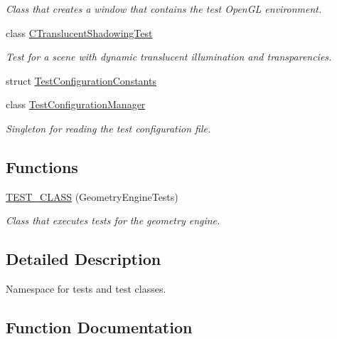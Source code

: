 \begin{DoxyCompactItemize}
\begin{DoxyCompactList}\small\item\em Class that creates a window that contains the test Open\+GL environment. \end{DoxyCompactList}\item 
class \mbox{\hyperlink{class_unit_test_1_1_c_translucent_shadowing_test}{C\+Translucent\+Shadowing\+Test}}
\begin{DoxyCompactList}\small\item\em Test for a scene with dynamic translucent illumination and transparencies. \end{DoxyCompactList}\item 
struct \mbox{\hyperlink{struct_unit_test_1_1_test_configuration_constants}{Test\+Configuration\+Constants}}
\item 
class \mbox{\hyperlink{class_unit_test_1_1_test_configuration_manager}{Test\+Configuration\+Manager}}
\begin{DoxyCompactList}\small\item\em Singleton for reading the test configuration file. \end{DoxyCompactList}\end{DoxyCompactItemize}
\subsection*{Functions}
\begin{DoxyCompactItemize}
\item 
\mbox{\hyperlink{namespace_unit_test_aa27c1a34f019a757474599d420492bf6}{T\+E\+S\+T\+\_\+\+C\+L\+A\+SS}} (Geometry\+Engine\+Tests)
\begin{DoxyCompactList}\small\item\em Class that executes tests for the geometry engine. \end{DoxyCompactList}\end{DoxyCompactItemize}


\subsection{Detailed Description}
Namespace for tests and test classes. 

\subsection{Function Documentation}
\mbox{\label{namespace_unit_test_aa27c1a34f019a757474599d420492bf6}} 
